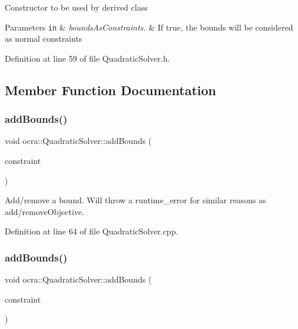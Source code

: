Constructor to be used by derived class


\begin{DoxyParams}[1]{Parameters}
\mbox{\tt in}  & {\em bounds\+As\+Constraints.} & If true, the bounds will be considered as normal constraints \\
\hline
\end{DoxyParams}


Definition at line 59 of file Quadratic\+Solver.\+h.



\subsection{Member Function Documentation}
\hypertarget{classocra_1_1QuadraticSolver_ade074ba982ae752d2ee9f12329f89787}{}\label{classocra_1_1QuadraticSolver_ade074ba982ae752d2ee9f12329f89787} 
\subsubsection{\texorpdfstring{add\+Bounds()}{addBounds()}\hspace{0.1cm}{\footnotesize\ttfamily [1/2]}}
{\footnotesize\ttfamily void ocra\+::\+Quadratic\+Solver\+::add\+Bounds (\begin{DoxyParamCaption}\item[{\hyperlink{namespaceocra_a6e55fff77635080219964abc301abf18}{Bound\+Constraint} \&}]{constraint }\end{DoxyParamCaption})}

Add/remove a bound. Will throw a runtime\+\_\+error for similar reasons as add/remove\+Objective. 

Definition at line 64 of file Quadratic\+Solver.\+cpp.

\hypertarget{classocra_1_1QuadraticSolver_a4f58274f5f1d0eb6645b3e20bc09f090}{}\label{classocra_1_1QuadraticSolver_a4f58274f5f1d0eb6645b3e20bc09f090} 
\subsubsection{\texorpdfstring{add\+Bounds()}{addBounds()}\hspace{0.1cm}{\footnotesize\ttfamily [2/2]}}
{\footnotesize\ttfamily void ocra\+::\+Quadratic\+Solver\+::add\+Bounds (\begin{DoxyParamCaption}\item[{\hyperlink{namespaceocra_a5fc023ff4ef8f4b0cdf410e088090731}{Identity\+Constraint} \&}]{constraint }\end{DoxyParamCaption})}



